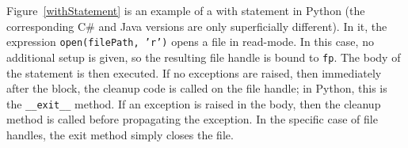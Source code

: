 \documentclass[11pt]{article}
\begin{document}

%
%
%    
%





Figure~\ref{withStatement} is an example of a with statement in Python (the corresponding C\# and Java versions are only superficially different).
In it, the expression \texttt{open(filePath, 'r')} opens a file in read-mode.
In this case, no additional setup is given, so the resulting file handle is bound to \texttt{fp}.
The body of the statement is then executed.
If no exceptions are raised, then immediately after the block, the cleanup code is called on the file handle; in Python, this is the \texttt{\_\_exit\_\_} method.
If an exception is raised in the body, then the cleanup method is called before propagating the exception.
In the specific case of file handles, the exit method simply closes the file.
\end{document}
